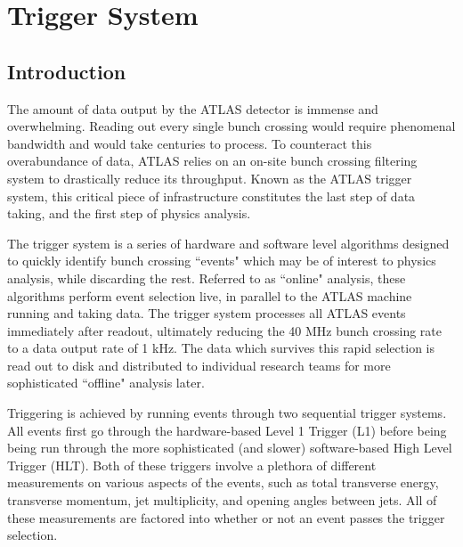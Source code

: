 \chapter{Trigger System} \label{chapter:trigger}

\section{Introduction}
    The amount of data output by the ATLAS detector is immense and overwhelming.
    Reading out every single bunch crossing would require phenomenal bandwidth and would take centuries to process.
    To counteract this overabundance of data, ATLAS relies on an on-site bunch crossing filtering system to drastically reduce its throughput.
    Known as the ATLAS trigger system, this critical piece of infrastructure constitutes the last step of data taking, and the first step of physics analysis.

    The trigger system is a series of hardware and software level algorithms designed to quickly identify bunch crossing ``events" which may be of interest to physics analysis, while discarding the rest.
    Referred to as ``online" analysis, these algorithms perform event selection live, in parallel to the ATLAS machine running and taking data.
    The trigger system processes all ATLAS events immediately after readout, ultimately reducing the 40 MHz bunch crossing rate to a data output rate of 1 kHz.
    The data which survives this rapid selection is read out to disk and distributed to individual research teams for more sophisticated ``offline" analysis later.
    
    Triggering is achieved by running events through two sequential trigger systems.
    All events first go through the hardware-based Level 1 Trigger (L1) before being being run through the more sophisticated (and slower) software-based High Level Trigger (HLT).
    Both of these triggers involve a plethora of different measurements on various aspects of the events, such as total transverse energy, transverse momentum, jet multiplicity, and opening angles between jets.
    All of these measurements are factored into whether or not an event passes the trigger selection.


